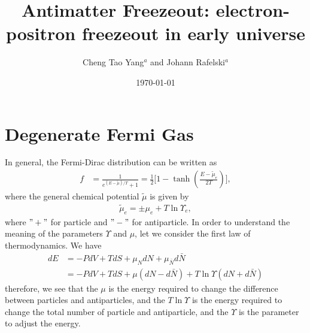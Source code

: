 \documentclass[onecolumn,preprintnumbers,amsmath,amssymb]{revtex4}
\begin{document}
\title{Antimatter Freezeout: electron-positron freezeout in early universe}
\author{Cheng Tao Yang${}^a$ and Johann Rafelski${}^a$}
\date{\today}


\maketitle

\section{Degenerate Fermi Gas}
In general, the Fermi-Dirac distribution can be written as
\begin{align}
\label{Fermi_exact}
f&=\frac{1}{e^{(E-\tilde{\mu})/T}+1}=\frac{1}{2}\bigg[1-\tanh{\left(\frac{E-\tilde{\mu}_e}{2T}\right)}\bigg],
\end{align}
where the general chemical potential $\tilde\mu$ is given by
\begin{align}
\tilde\mu_e=\pm\mu_e+T\ln\Upsilon_e,
\end{align}
where $"+"$ for particle and $"-"$ for antiparticle. In order to understand the meaning of the parameters $\Upsilon$ and $\mu$, let we consider the first law of thermodynamics. We have
\begin{align}
dE&=-PdV+TdS+{\mu_N}dN+{\mu_{\bar{N}}}d{\bar{N}}
\\&=-PdV+TdS+{\mu}(dN-d{\bar{N}})+T\ln{\Upsilon}(dN+d{\bar{N}})
\end{align}
therefore, we see that the $\mu$ is the energy required to change the difference between particles and antiparticles, and the $T\ln\Upsilon$ is the energy required to change the total number of particle and antiparticle, and the $\Upsilon$ is the parameter to adjust the energy.
\end{document}
